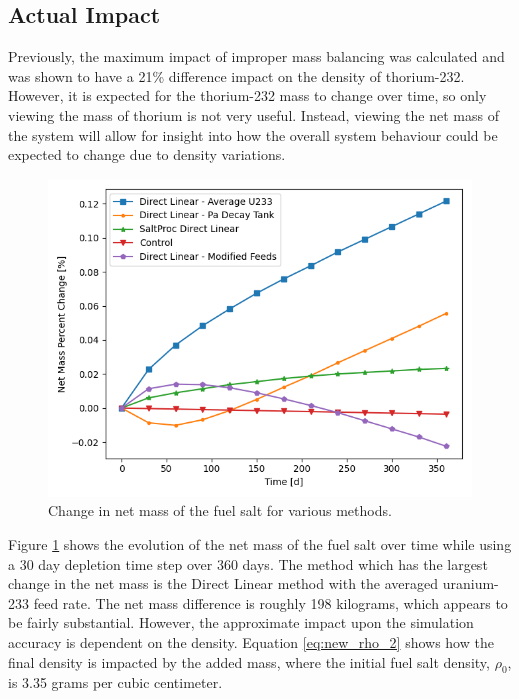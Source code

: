 \subsection{Actual Impact}

Previously, the maximum impact of improper mass balancing was calculated and was shown to have a 21\% difference impact on the density of thorium-232. However, it is expected for the thorium-232 mass to change over time, so only viewing the mass of thorium is not very useful. Instead, viewing the net mass of the system will allow for insight into how the overall system behaviour could be expected to change due to density variations.

\begin{figure}[H]
  \centering
  \includegraphics[scale=0.7]{images/net-mass-pcnt-change.png}
  \caption{Change in net mass of the fuel salt for various methods.}
   \label{fig:net-mass-bal}
\end{figure}

Figure \ref{fig:net-mass-bal} shows the evolution of the net mass of the fuel salt over time while using a 30 day depletion time step over 360 days. The method which has the largest change in the net mass is the Direct Linear method with the averaged uranium-233 feed rate. The net mass difference is roughly 198 kilograms, which appears to be fairly substantial. However, the approximate impact upon the simulation accuracy is dependent on the density. Equation \eqref{eq:new_rho_2} shows how the final density is impacted by the added mass, where the initial fuel salt density, $\rho_0$, is 3.35 grams per cubic centimeter. 

